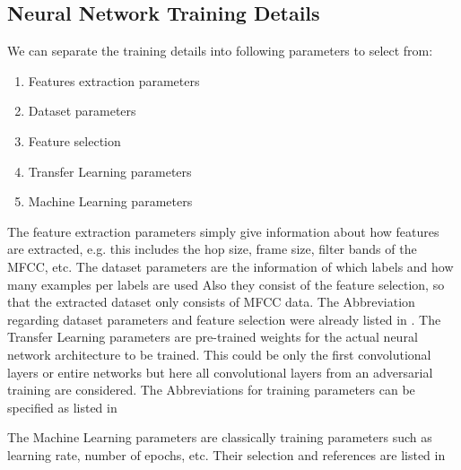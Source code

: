 \subsection{Neural Network Training Details}\label{sec:exp_details_training}
We can separate the training details into following parameters to select from:
\begin{enumerate}
  \item Features extraction parameters
  \item Dataset parameters
  \item Feature selection
  \item Transfer Learning parameters
  \item Machine Learning parameters
\end{enumerate}
The feature extraction parameters simply give information about how features are extracted, e.g. this includes the hop size, frame size, filter bands of the MFCC, etc.
The dataset parameters are the information of which labels and how many examples per labels are used
Also they consist of the feature selection, so that the extracted dataset only consists of MFCC data. 
The Abbreviation regarding dataset parameters and feature selection were already listed in .
The Transfer Learning parameters are pre-trained weights for the actual neural network architecture to be trained.
This could be only the first convolutional layers or entire networks but here all convolutional layers from an adversarial training are considered. 
The Abbreviations for training parameters can be specified as listed in 


The Machine Learning parameters are classically training parameters such as learning rate, number of epochs, etc.
Their selection and references are listed in 



